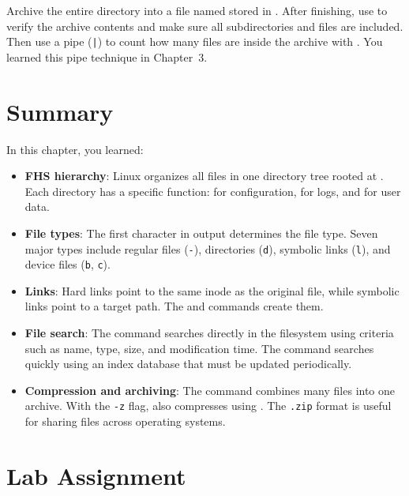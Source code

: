 \begin{challengebox}
Archive the entire  directory into a file named  stored in . After finishing, use  to verify the archive contents and make sure all subdirectories and files are included. Then use a pipe (\texttt{|}) to count how many files are inside the archive with . You learned this pipe technique in Chapter~3.
\end{challengebox}

\section{Summary}
\label{sec:summary-filesystem}

In this chapter, you learned:

\begin{itemize}[noitemsep,topsep=2pt]
    \item \textbf{FHS hierarchy}: Linux organizes all files in one directory tree rooted at \dir{/}. Each directory has a specific function:  for configuration,  for logs, and  for user data.
    \item \textbf{File types}: The first character in  output determines the file type. Seven major types include regular files (\texttt{-}), directories (\texttt{d}), symbolic links (\texttt{l}), and device files (\texttt{b}, \texttt{c}).
    \item \textbf{Links}: Hard links point to the same inode as the original file, while symbolic links point to a target path. The  and  commands create them.
    \item \textbf{File search}: The  command searches directly in the filesystem using criteria such as name, type, size, and modification time. The  command searches quickly using an index database that must be updated periodically.
    \item \textbf{Compression and archiving}: The  command combines many files into one archive. With the \texttt{-z} flag,  also compresses using . The \texttt{.zip} format is useful for sharing files across operating systems.
\end{itemize}

\section{Lab Assignment}
\label{sec:exercises-filesystem}

